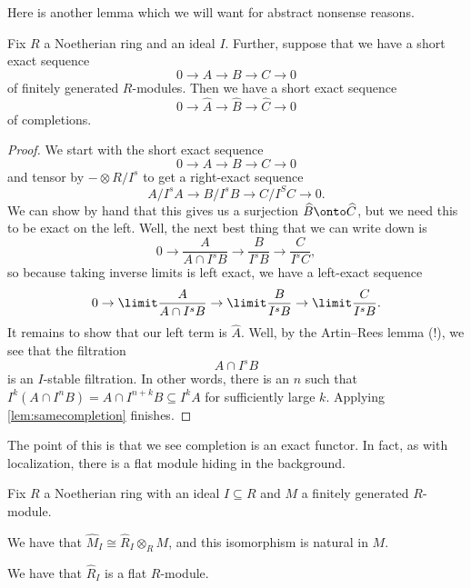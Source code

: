 Here is another lemma which we will want for abstract nonsense reasons.
\begin{lemma}
	Fix $R$ a Noetherian ring and an ideal $I$. Further, suppose that we have a short exact sequence
	\[0\to A\to B\to C\to 0\]
	of finitely generated $R$-modules. Then we have a short exact sequence
	\[0\to\widehat A\to\widehat B\to\widehat C\to0\]
	of completions.
\end{lemma}
\begin{proof}
	We start with the short exact sequence
	\[0\to A\to B\to C\to 0\]
	and tensor by $-\otimes R/I^s$ to get a right-exact sequence
	\[A/I^sA\to B/I^sB\to C/I^SC\to0.\]
	We can show by hand that this gives us a surjection $\widehat B\onto\widehat C$, but we need this to be exact on the left. Well, the next best thing that we can write down is
	\[0\to\frac A{A\cap I^sB}\to\frac B{I^sB}\to\frac C{I^sC},\]
	so because taking inverse limits is left exact, we have a left-exact sequence
	\[0\to\limit\frac A{A\cap I^sB}\to\limit\frac B{I^sB}\to\limit\frac C{I^sB}.\]
	It remains to show that our left term is $\widehat A$. Well, by the Artin--Rees lemma (!), we see that the filtration
	\[A\cap I^sB\]
	is an $I$-stable filtration. In other words, there is an $n$ such that $I^k(A\cap I^nB)=A\cap I^{n+k}B\subseteq I^kA$ for sufficiently large $k$. Applying \autoref{lem:samecompletion} finishes.
\end{proof}
The point of this is that we see completion is an exact functor. In fact, as with localization, there is a flat module hiding in the background.
\begin{theorem}
	Fix $R$ a Noetherian ring with an ideal $I\subseteq R$ and $M$ a finitely generated $R$-module.
	\begin{listalph}
		\item We have that $\widehat M_I\cong\widehat R_I\otimes_RM$, and this isomorphism is natural in $M$.
		\item We have that $\widehat R_I$ is a flat $R$-module.
	\end{listalph}
\end{theorem}
